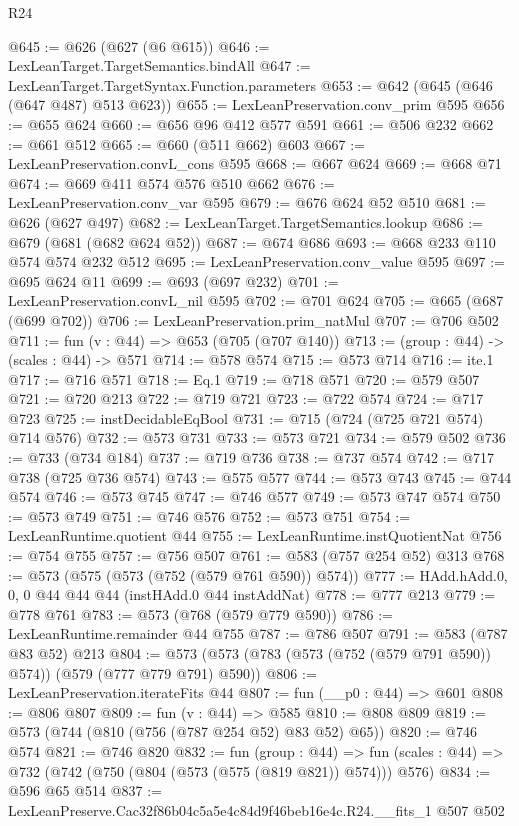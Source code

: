 \begin{lexlean}{R24}
\begin{coremodule}
@645 := @626 (@627 (@6 @615))
@646 := LexLeanTarget.TargetSemantics.bindAll
@647 := LexLeanTarget.TargetSyntax.Function.parameters
@653 := @642 (@645 (@646 (@647 @487) @513 @623))
@655 := LexLeanPreservation.conv_prim @595
@656 := @655 @624
@660 := @656 @96 @412 @577 @591
@661 := @506 @232
@662 := @661 @512
@665 := @660 (@511 @662) @603
@667 := LexLeanPreservation.convL_cons @595
@668 := @667 @624
@669 := @668 @71
@674 := @669 @411 @574 @576 @510 @662
@676 := LexLeanPreservation.conv_var @595
@679 := @676 @624 @52 @510
@681 := @626 (@627 @497)
@682 := LexLeanTarget.TargetSemantics.lookup
@686 := @679 (@681 (@682 @624 @52))
@687 := @674 @686
@693 := @668 @233 @110 @574 @574 @232 @512
@695 := LexLeanPreservation.conv_value @595
@697 := @695 @624 @11
@699 := @693 (@697 @232)
@701 := LexLeanPreservation.convL_nil @595
@702 := @701 @624
@705 := @665 (@687 (@699 @702))
@706 := LexLeanPreservation.prim_natMul
@707 := @706 @502
@711 := fun (v : @44) => @653 (@705 (@707 @140))
@713 := (group : @44) -> (scales : @44) -> @571
@714 := @578 @574
@715 := @573 @714
@716 := ite.{1}
@717 := @716 @571
@718 := Eq.{1}
@719 := @718 @571
@720 := @579 @507
@721 := @720 @213
@722 := @719 @721
@723 := @722 @574
@724 := @717 @723
@725 := instDecidableEqBool
@731 := @715 (@724 (@725 @721 @574) @714 @576)
@732 := @573 @731
@733 := @573 @721
@734 := @579 @502
@736 := @733 (@734 @184)
@737 := @719 @736
@738 := @737 @574
@742 := @717 @738 (@725 @736 @574)
@743 := @575 @577
@744 := @573 @743
@745 := @744 @574
@746 := @573 @745
@747 := @746 @577
@749 := @573 @747 @574
@750 := @573 @749
@751 := @746 @576
@752 := @573 @751
@754 := LexLeanRuntime.quotient @44
@755 := LexLeanRuntime.instQuotientNat
@756 := @754 @755
@757 := @756 @507
@761 := @583 (@757 @254 @52) @313
@768 := @573 (@575 (@573 (@752 (@579 @761 @590)) @574))
@777 := HAdd.hAdd.{0, 0, 0} @44 @44 @44 (instHAdd.{0} @44 instAddNat)
@778 := @777 @213
@779 := @778 @761
@783 := @573 (@768 (@579 @779 @590))
@786 := LexLeanRuntime.remainder @44 @755
@787 := @786 @507
@791 := @583 (@787 @83 @52) @213
@804 := @573 (@573 (@783 (@573 (@752 (@579 @791 @590)) @574)) (@579 (@777 @779 @791) @590))
@806 := LexLeanPreservation.iterateFits @44
@807 := fun (__p0 : @44) => @601
@808 := @806 @807
@809 := fun (v : @44) => @585
@810 := @808 @809
@819 := @573 (@744 (@810 (@756 (@787 @254 @52) @83 @52) @65))
@820 := @746 @574
@821 := @746 @820
@832 := fun (group : @44) =>
  fun (scales : @44) => @732 (@742 (@750 (@804 (@573 (@575 (@819 @821)) @574))) @576)
@834 := @596 @65 @514
@837 := LexLeanPreserve.Cac32f86b04c5a5e4c84d9f46beb16e4c.R24.__fits_1 @507 @502

\end{coremodule}
\end{lexlean}
